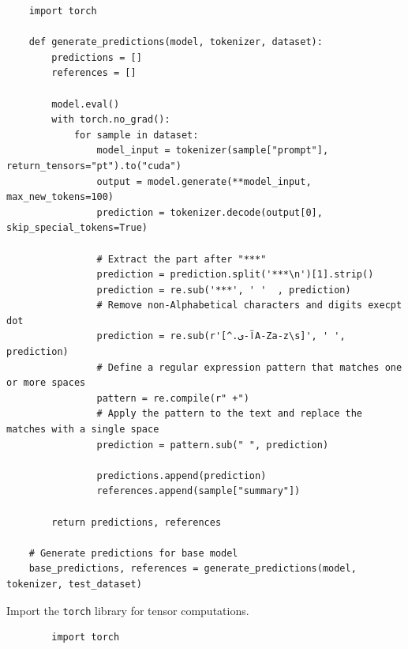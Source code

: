 \documentclass{solutionclass} %
\begin{document}
\begin{lstlisting}
	import torch

	def generate_predictions(model, tokenizer, dataset):
		predictions = []
		references = []
	
		model.eval()
		with torch.no_grad():
			for sample in dataset:
				model_input = tokenizer(sample["prompt"], return_tensors="pt").to("cuda")
				output = model.generate(**model_input, max_new_tokens=100)
				prediction = tokenizer.decode(output[0], skip_special_tokens=True)
			
				# Extract the part after "***"
				prediction = prediction.split('***\n')[1].strip()
				prediction = re.sub('***', ' '  , prediction)
				# Remove non-Alphabetical characters and digits execpt dot
				prediction = re.sub(r'[^.آ-یA-Za-z\s]', ' ', prediction)
				# Define a regular expression pattern that matches one or more spaces
				pattern = re.compile(r" +")
				# Apply the pattern to the text and replace the matches with a single space
				prediction = pattern.sub(" ", prediction)
				
				predictions.append(prediction)
				references.append(sample["summary"])
	
		return predictions, references
	
	# Generate predictions for base model
	base_predictions, references = generate_predictions(model, tokenizer, test_dataset)
\end{lstlisting}

\begin{solution}
	Import the \texttt{torch} library for tensor computations.
	\begin{lstlisting}
		import torch
	\end{lstlisting}
\end{solution}
\end{document}
